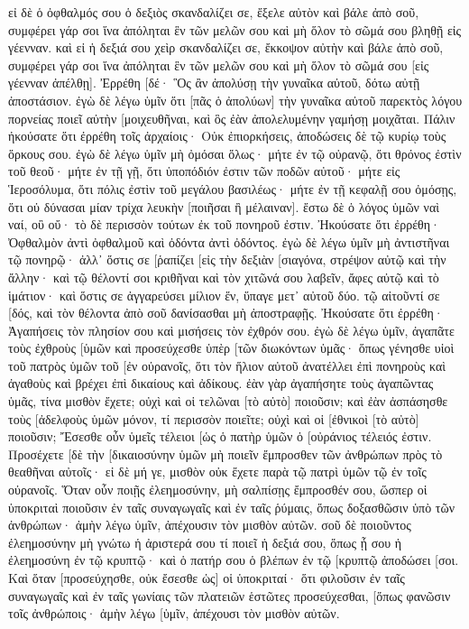 εἰ δὲ ὁ ὀφθαλμός σου ὁ δεξιὸς σκανδαλίζει σε, ἔξελε αὐτὸν καὶ βάλε ἀπὸ σοῦ, συμφέρει γάρ σοι ἵνα ἀπόληται ἓν τῶν μελῶν σου καὶ μὴ ὅλον τὸ σῶμά σου βληθῇ εἰς γέενναν. 
καὶ εἰ ἡ δεξιά σου χεὶρ σκανδαλίζει σε, ἔκκοψον αὐτὴν καὶ βάλε ἀπὸ σοῦ, συμφέρει γάρ σοι ἵνα ἀπόληται ἓν τῶν μελῶν σου καὶ μὴ ὅλον τὸ σῶμά σου [εἰς γέενναν ἀπέλθῃ]. 
Ἐρρέθη [δέ· Ὃς ἂν ἀπολύσῃ τὴν γυναῖκα αὐτοῦ, δότω αὐτῇ ἀποστάσιον. 
ἐγὼ δὲ λέγω ὑμῖν ὅτι [πᾶς ὁ ἀπολύων] τὴν γυναῖκα αὐτοῦ παρεκτὸς λόγου πορνείας ποιεῖ αὐτὴν [μοιχευθῆναι, καὶ ὃς ἐὰν ἀπολελυμένην γαμήσῃ μοιχᾶται. 
Πάλιν ἠκούσατε ὅτι ἐρρέθη τοῖς ἀρχαίοις· Οὐκ ἐπιορκήσεις, ἀποδώσεις δὲ τῷ κυρίῳ τοὺς ὅρκους σου. 
ἐγὼ δὲ λέγω ὑμῖν μὴ ὀμόσαι ὅλως· μήτε ἐν τῷ οὐρανῷ, ὅτι θρόνος ἐστὶν τοῦ θεοῦ· 
μήτε ἐν τῇ γῇ, ὅτι ὑποπόδιόν ἐστιν τῶν ποδῶν αὐτοῦ· μήτε εἰς Ἱεροσόλυμα, ὅτι πόλις ἐστὶν τοῦ μεγάλου βασιλέως· 
μήτε ἐν τῇ κεφαλῇ σου ὀμόσῃς, ὅτι οὐ δύνασαι μίαν τρίχα λευκὴν [ποιῆσαι ἢ μέλαιναν]. 
ἔστω δὲ ὁ λόγος ὑμῶν ναὶ ναί, οὒ οὔ· τὸ δὲ περισσὸν τούτων ἐκ τοῦ πονηροῦ ἐστιν. 
Ἠκούσατε ὅτι ἐρρέθη· Ὀφθαλμὸν ἀντὶ ὀφθαλμοῦ καὶ ὀδόντα ἀντὶ ὀδόντος. 
ἐγὼ δὲ λέγω ὑμῖν μὴ ἀντιστῆναι τῷ πονηρῷ· ἀλλ᾽ ὅστις σε [ῥαπίζει [εἰς τὴν δεξιὰν [σιαγόνα, στρέψον αὐτῷ καὶ τὴν ἄλλην· 
καὶ τῷ θέλοντί σοι κριθῆναι καὶ τὸν χιτῶνά σου λαβεῖν, ἄφες αὐτῷ καὶ τὸ ἱμάτιον· 
καὶ ὅστις σε ἀγγαρεύσει μίλιον ἕν, ὕπαγε μετ᾽ αὐτοῦ δύο. 
τῷ αἰτοῦντί σε [δός, καὶ τὸν θέλοντα ἀπὸ σοῦ δανίσασθαι μὴ ἀποστραφῇς. 
Ἠκούσατε ὅτι ἐρρέθη· Ἀγαπήσεις τὸν πλησίον σου καὶ μισήσεις τὸν ἐχθρόν σου. 
ἐγὼ δὲ λέγω ὑμῖν, ἀγαπᾶτε τοὺς ἐχθροὺς [ὑμῶν καὶ προσεύχεσθε ὑπὲρ [τῶν διωκόντων ὑμᾶς· 
ὅπως γένησθε υἱοὶ τοῦ πατρὸς ὑμῶν τοῦ [ἐν οὐρανοῖς, ὅτι τὸν ἥλιον αὐτοῦ ἀνατέλλει ἐπὶ πονηροὺς καὶ ἀγαθοὺς καὶ βρέχει ἐπὶ δικαίους καὶ ἀδίκους. 
ἐὰν γὰρ ἀγαπήσητε τοὺς ἀγαπῶντας ὑμᾶς, τίνα μισθὸν ἔχετε; οὐχὶ καὶ οἱ τελῶναι [τὸ αὐτὸ] ποιοῦσιν; 
καὶ ἐὰν ἀσπάσησθε τοὺς [ἀδελφοὺς ὑμῶν μόνον, τί περισσὸν ποιεῖτε; οὐχὶ καὶ οἱ [ἐθνικοὶ [τὸ αὐτὸ] ποιοῦσιν; 
Ἔσεσθε οὖν ὑμεῖς τέλειοι [ὡς ὁ πατὴρ ὑμῶν ὁ [οὐράνιος τέλειός ἐστιν. 
Προσέχετε [δὲ τὴν [δικαιοσύνην ὑμῶν μὴ ποιεῖν ἔμπροσθεν τῶν ἀνθρώπων πρὸς τὸ θεαθῆναι αὐτοῖς· εἰ δὲ μή γε, μισθὸν οὐκ ἔχετε παρὰ τῷ πατρὶ ὑμῶν τῷ ἐν τοῖς οὐρανοῖς. 
Ὅταν οὖν ποιῇς ἐλεημοσύνην, μὴ σαλπίσῃς ἔμπροσθέν σου, ὥσπερ οἱ ὑποκριταὶ ποιοῦσιν ἐν ταῖς συναγωγαῖς καὶ ἐν ταῖς ῥύμαις, ὅπως δοξασθῶσιν ὑπὸ τῶν ἀνθρώπων· ἀμὴν λέγω ὑμῖν, ἀπέχουσιν τὸν μισθὸν αὐτῶν. 
σοῦ δὲ ποιοῦντος ἐλεημοσύνην μὴ γνώτω ἡ ἀριστερά σου τί ποιεῖ ἡ δεξιά σου, 
ὅπως ᾖ σου ἡ ἐλεημοσύνη ἐν τῷ κρυπτῷ· καὶ ὁ πατήρ σου ὁ βλέπων ἐν τῷ [κρυπτῷ ἀποδώσει [σοι. 
Καὶ ὅταν [προσεύχησθε, οὐκ ἔσεσθε ὡς] οἱ ὑποκριταί· ὅτι φιλοῦσιν ἐν ταῖς συναγωγαῖς καὶ ἐν ταῖς γωνίαις τῶν πλατειῶν ἑστῶτες προσεύχεσθαι, [ὅπως φανῶσιν τοῖς ἀνθρώποις· ἀμὴν λέγω [ὑμῖν, ἀπέχουσι τὸν μισθὸν αὐτῶν. 
